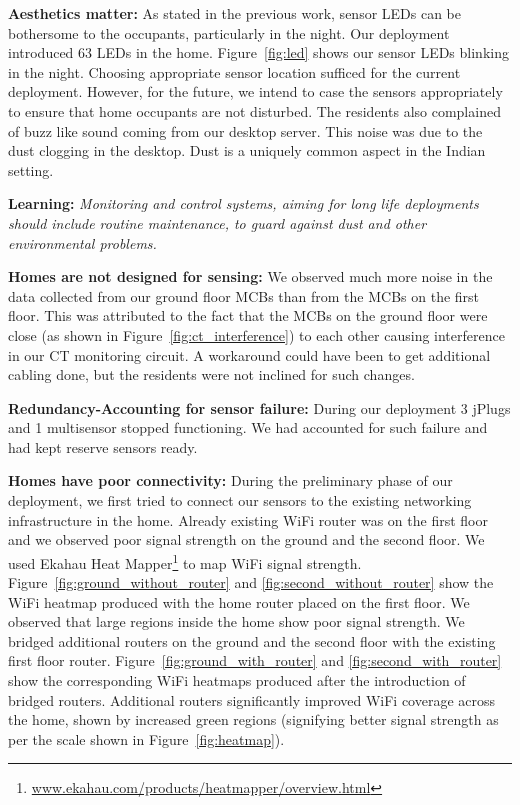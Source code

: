 \documentclass[10pt]{sensys-proc}
\newcommand{\figref}[1]{Figure~\ref{#1}}
\begin{document}
\noindent \textbf{Aesthetics matter:} As stated in the previous work, sensor LEDs can be bothersome to the occupants, particularly in the night. Our deployment introduced 63 LEDs in the home. \figref{fig:led} shows our sensor LEDs blinking in the night. Choosing appropriate sensor location sufficed for the current deployment. However, for the future, we intend to case the sensors appropriately to ensure that home occupants are not disturbed. The residents also complained of buzz like sound coming from our desktop server. This noise was due to the dust clogging in the desktop. Dust is a uniquely common aspect in the Indian setting. 

\textbf{Learning:} \emph{Monitoring and control systems, aiming for long life deployments should include routine maintenance, to guard against dust and other environmental problems.}

\noindent \textbf{Homes are not designed for sensing:} We observed much more noise in the data collected from our ground floor MCBs than from the MCBs on the first floor. This was attributed to the fact that the MCBs on the ground floor were close (as shown in \figref{fig:ct_interference}) to each other causing interference in our CT monitoring circuit. A workaround could have been to get additional cabling done, but the residents were not inclined for such changes. %

\noindent \textbf{Redundancy-Accounting for sensor failure:} During our deployment 3 jPlugs and 1 multisensor stopped functioning. We had accounted for such failure and had kept reserve sensors ready. %

\noindent \textbf{Homes have poor connectivity:} During the preliminary phase of our deployment, we first tried to connect our sensors to the existing networking infrastructure in the home. Already existing WiFi router was on the first floor and we observed poor signal strength on the ground and the second floor. We used Ekahau Heat Mapper\footnote{\url{www.ekahau.com/products/heatmapper/overview.html}} to map WiFi signal strength. \figref{fig:ground_without_router} and \ref{fig:second_without_router} show the WiFi heatmap produced with the home router placed on the first floor. We observed that large regions inside the home show poor signal strength. We bridged additional routers on the ground and the second floor with the existing first floor router. \figref{fig:ground_with_router} and \ref{fig:second_with_router} show the corresponding WiFi heatmaps produced after the introduction of bridged routers. Additional routers significantly improved WiFi coverage across the home, shown by increased green regions (signifying better signal strength as per the scale shown in \figref{fig:heatmap}). 
\end{document}
